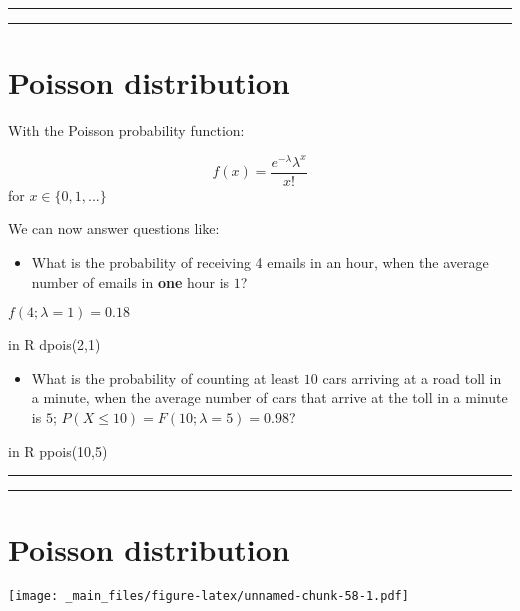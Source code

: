 \documentclass[
]{book}
\providecommand{\tightlist}{%
  \setlength{\itemsep}{0pt}\setlength{\parskip}{0pt}}
\begin{document}
\begin{center}\rule{0.5\linewidth}{0.5pt}\end{center}

\begin{center}\rule{0.5\linewidth}{0.5pt}\end{center}

\hypertarget{poisson-distribution-4}{%
\section{Poisson distribution}\label{poisson-distribution-4}}

With the Poisson probability function:

\[f(x)= \frac{e^{-\lambda}\lambda^x}{x!}\] for \(x \in \{0, 1, ...\}\)

We can now answer questions like:

\begin{itemize}
\tightlist
\item
  What is the probability of receiving 4 emails in an hour, when the average number of emails in \textbf{one} hour is \(1\)?
\end{itemize}

\(f(4; \lambda=1)=0.18\)

in R dpois(2,1)

\begin{itemize}
\tightlist
\item
  What is the probability of counting at least \(10\) cars arriving at a road toll in a minute, when the average number of cars that arrive at the toll in a minute is \(5\);
  \(P(X \leq 10)=F(10; \lambda=5)=0.98\)?
\end{itemize}

in R ppois(10,5)

\begin{center}\rule{0.5\linewidth}{0.5pt}\end{center}

\begin{center}\rule{0.5\linewidth}{0.5pt}\end{center}

\hypertarget{poisson-distribution-5}{%
\section{Poisson distribution}\label{poisson-distribution-5}}

\texttt{[image: \_main\_files/figure-latex/unnamed-chunk-58-1.pdf]}
\end{document}
